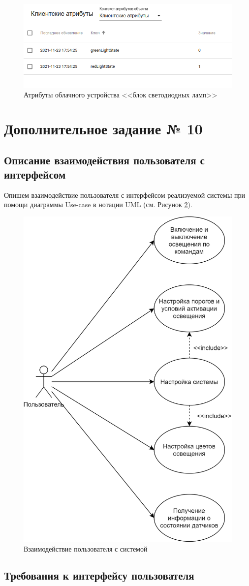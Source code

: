 \documentclass[a4paper,14pt]{extarticle}
\begin{document}
\begin{figure}[h!]
	\centering
	\includegraphics[width=0.6\linewidth]{images/attr-2}
	\caption{Атрибуты облачного устройства <<блок светодиодных ламп>>}
	\label{fig:attr-2}
\end{figure}


\section{Дополнительное задание № 10}

\subsection*{Описание взаимодействия пользователя с интерфейсом}
Опишем взаимодействие пользователя с интерфейсом реализуемой системы при помощи диаграммы Use-case в нотации UML (см. Рисунок \ref{fig:usecase-10}). 

\begin{figure}[h!]
	\centering
	\includegraphics[width=0.4\linewidth]{images/usecase-10}
	\caption{Взаимодействие пользователя с системой}
	\label{fig:usecase-10}
\end{figure}


\subsection{Требования к интерфейсу пользователя}
\end{document}

